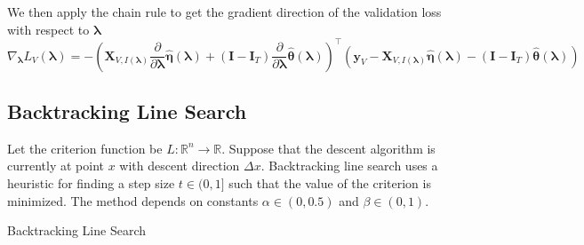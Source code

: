 \documentclass[12pt,letterpaper]{article}
\begin{document}
We then apply the chain rule to get the gradient direction of the validation loss with respect to $\boldsymbol \lambda$
\begin{equation}
\nabla_{\boldsymbol{\lambda}} L_V(\boldsymbol{\lambda}) =
- \left(
\boldsymbol{X}_{V, I(\boldsymbol\lambda)} \frac{\partial}{\partial \boldsymbol{\lambda}}\hat{\boldsymbol\eta}(\boldsymbol{\lambda})
+ (\boldsymbol I - \boldsymbol{I}_T) \frac{\partial}{\partial \boldsymbol{\lambda}}\hat{\boldsymbol\theta}(\boldsymbol{\lambda})
\right )^\top
\left (
\boldsymbol{y}_V
- \boldsymbol{X}_{V, I(\boldsymbol\lambda)} \hat{\boldsymbol\eta}(\boldsymbol{\lambda})
- (\boldsymbol I - \boldsymbol{I}_T) \hat{\boldsymbol\theta}(\boldsymbol{\lambda})
\right )
\end{equation}


\subsection{Backtracking Line Search}

Let the criterion function be $L:\mathbb{R}^n \rightarrow \mathbb{R}$. Suppose that the descent algorithm is currently at point $x$ with descent direction $\Delta x$. Backtracking line search uses a heuristic for finding a step size $t \in (0,1]$ such that the value of the criterion is minimized. The method depends on constants $\alpha  \in (0, 0.5)$ and $\beta \in (0,1)$.

\begin{algorithm}
\caption{Backtracking Line Search}
\label{alg:backtracking}
         \begin{algorithmic}
  	 \\
	\ENDWHILE
	\end{algorithmic}
\end{algorithm}
\end{document}
